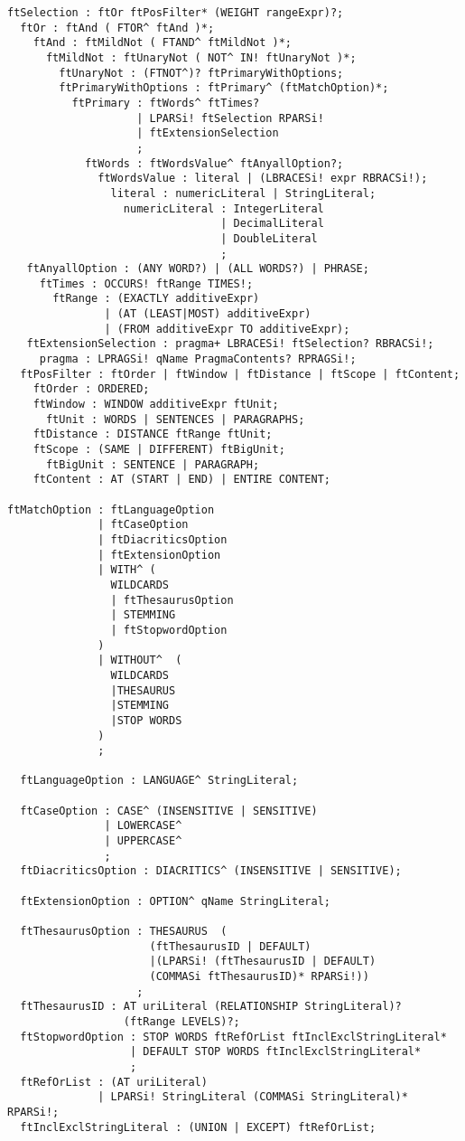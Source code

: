 \begin{verbatim}
ftSelection : ftOr ftPosFilter* (WEIGHT rangeExpr)?;
  ftOr : ftAnd ( FTOR^ ftAnd )*;
    ftAnd : ftMildNot ( FTAND^ ftMildNot )*;
      ftMildNot : ftUnaryNot ( NOT^ IN! ftUnaryNot )*;
        ftUnaryNot : (FTNOT^)? ftPrimaryWithOptions;
        ftPrimaryWithOptions : ftPrimary^ (ftMatchOption)*;
          ftPrimary : ftWords^ ftTimes? 
                    | LPARSi! ftSelection RPARSi! 
                    | ftExtensionSelection
                    ;
            ftWords : ftWordsValue^ ftAnyallOption?;
              ftWordsValue : literal | (LBRACESi! expr RBRACSi!);
                literal : numericLiteral | StringLiteral;
                  numericLiteral : IntegerLiteral 
                                 | DecimalLiteral 
                                 | DoubleLiteral
                                 ;
   ftAnyallOption : (ANY WORD?) | (ALL WORDS?) | PHRASE;
     ftTimes : OCCURS! ftRange TIMES!;
       ftRange : (EXACTLY additiveExpr)
               | (AT (LEAST|MOST) additiveExpr)
               | (FROM additiveExpr TO additiveExpr);
   ftExtensionSelection : pragma+ LBRACESi! ftSelection? RBRACSi!;
     pragma : LPRAGSi! qName PragmaContents? RPRAGSi!;
  ftPosFilter : ftOrder | ftWindow | ftDistance | ftScope | ftContent;
    ftOrder : ORDERED;
    ftWindow : WINDOW additiveExpr ftUnit;
      ftUnit : WORDS | SENTENCES | PARAGRAPHS;
    ftDistance : DISTANCE ftRange ftUnit;
    ftScope : (SAME | DIFFERENT) ftBigUnit;
      ftBigUnit : SENTENCE | PARAGRAPH;
    ftContent : AT (START | END) | ENTIRE CONTENT;

ftMatchOption : ftLanguageOption
              | ftCaseOption
              | ftDiacriticsOption
              | ftExtensionOption
              | WITH^ (
                WILDCARDS
                | ftThesaurusOption
                | STEMMING
                | ftStopwordOption
              )
              | WITHOUT^  (
                WILDCARDS
                |THESAURUS
                |STEMMING
                |STOP WORDS
              )
              ;

  ftLanguageOption : LANGUAGE^ StringLiteral;

  ftCaseOption : CASE^ (INSENSITIVE | SENSITIVE)
               | LOWERCASE^
               | UPPERCASE^
               ;
  ftDiacriticsOption : DIACRITICS^ (INSENSITIVE | SENSITIVE);

  ftExtensionOption : OPTION^ qName StringLiteral;

  ftThesaurusOption : THESAURUS  (
                      (ftThesaurusID | DEFAULT)
                      |(LPARSi! (ftThesaurusID | DEFAULT) 
                      (COMMASi ftThesaurusID)* RPARSi!))
                    ;
  ftThesaurusID : AT uriLiteral (RELATIONSHIP StringLiteral)? 
                  (ftRange LEVELS)?;
  ftStopwordOption : STOP WORDS ftRefOrList ftInclExclStringLiteral*
                   | DEFAULT STOP WORDS ftInclExclStringLiteral*
                   ;
  ftRefOrList : (AT uriLiteral)
              | LPARSi! StringLiteral (COMMASi StringLiteral)* RPARSi!;
  ftInclExclStringLiteral : (UNION | EXCEPT) ftRefOrList;


\end{verbatim}
